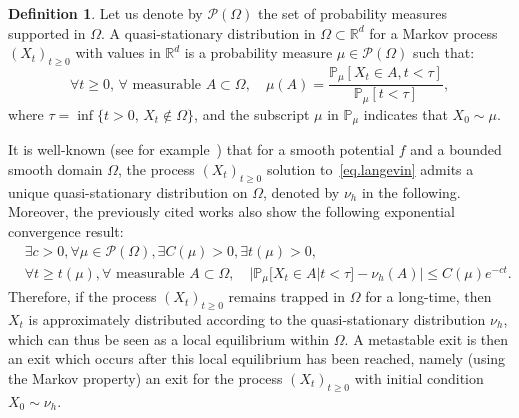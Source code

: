 \documentclass[JEP,XML,SOM,Unicode,NoEqCountersInSection,NoFloatCountersInSection,published]{cedram}
\theoremstyle{plain}
\theoremstyle{definition}
\newtheorem{definition}[proposition]{Definition}
\begin{document}
\begin{definition} Let us denote by $\mathcal P(\Omega)$ the set of
probability measures supported in $\Omega$. A quasi-stationary
distribution in $\Omega \subset \mathbb R^d$
for a Markov process $(X_t)_{t \ge 0}$ with values in $\mathbb R^d$
is a probability measure $\mu \in \mathcal P(\Omega)$
such that:
\[
\forall t\ge 0,\, \forall \text{ measurable }A\subset\Omega, \quad
\mu (A)=\frac{ \mathbb P_\mu \left[X_t \in A, t<\tau\right] }{ \mathbb P_\mu \left[t<\tau \right]},
\]
where $\tau = \inf\{t >0, \, X_t \not \in \Omega\}$, and the subscript
$\mu$ in $\mathbb P_\mu$ indicates that $X_0 \sim \mu$.
\end{definition}
It is well-known (see for
example~\cite{le2012mathematical,ChampagnatCoulibaly}) that for a
smooth potential $f$ and a bounded smooth domain $\Omega$, the process
$(X_t)_{t \ge0}$ solution to~\eqref{eq.langevin} admits a unique
quasi-stationary distribution on $\Omega$, denoted by
$\nu_h$ in the following. Moreover, the
previously cited works also show the following exponential convergence
result:
\begin{equation}\label{eq.con-c}
\begin{aligned}
&\exists c>0, \forall \mu \in \mathcal P(\Omega), \exists C(\mu)>0, \exists t(\mu)>0,\\
&\forall t\ge t(\mu), \forall \text{ measurable }A\subset\Omega, \quad \big \vert \mathbb P_\mu\big[X_t\in A\big | t<\tau \big] -\nu_h(A) \big \vert \le C(\mu)e^{-ct}.
\end{aligned}
\end{equation}
Therefore, if the process $(X_t)_{t \ge0}$ remains trapped in $\Omega$
for a long-time, then $X_t$ is approximately distributed according to the
quasi-stationary distribution $\nu_h$, which can thus be seen as a
local equilibrium within $\Omega$. A metastable exit is then an exit
which occurs after this local equilibrium has been reached, namely
(using the Markov property)
an exit for the process $(X_t)_{t \ge0}$ with initial condition $X_0
\sim \nu_h$.
\end{document}
